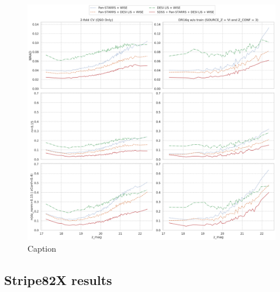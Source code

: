 \documentclass[fleqn,usenatbib]{mnras}
\begin{document}
\begin{figure}[ht]
    \centering
    \includegraphics[width=0.9\linewidth]{images/metrics_z-mag.png}
    \caption{Caption}
    \label{fig:metrics_z_mag}
\end{figure}

\subsection{Stripe82X results}
\end{document}
